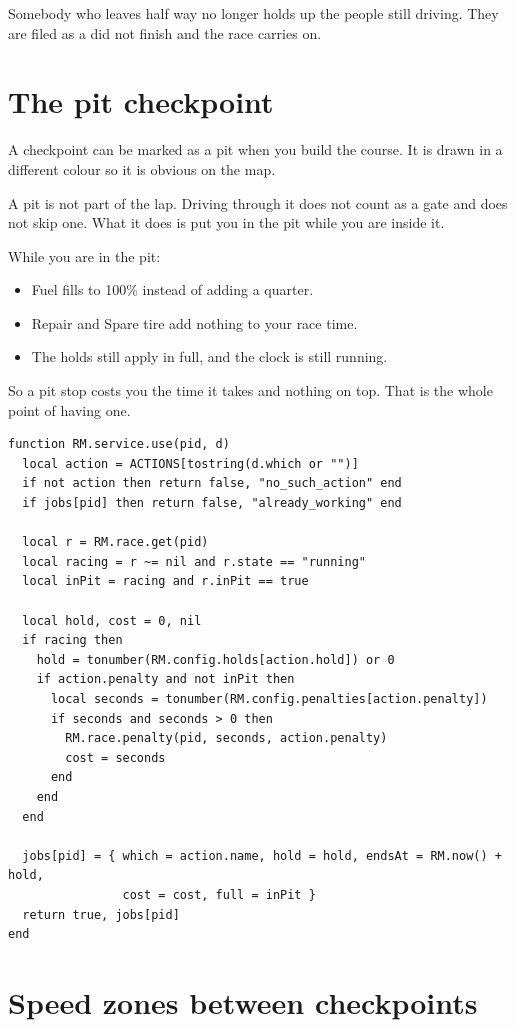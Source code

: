 \documentclass[11pt,a4paper]{article}
\begin{document}
Somebody who leaves half way no longer holds up the people still driving. They
are filed as a did not finish and the race carries on.

\section{The pit checkpoint}

A checkpoint can be marked as a pit when you build the course. It is drawn in a
different colour so it is obvious on the map.

A pit is not part of the lap. Driving through it does not count as a gate and
does not skip one. What it does is put you in the pit while you are inside it.

While you are in the pit:

\begin{itemize}
  \item Fuel fills to 100\% instead of adding a quarter.
  \item Repair and Spare tire add nothing to your race time.
  \item The holds still apply in full, and the clock is still running.
\end{itemize}

So a pit stop costs you the time it takes and nothing on top. That is the whole
point of having one.

\begin{lstlisting}
function RM.service.use(pid, d)
  local action = ACTIONS[tostring(d.which or "")]
  if not action then return false, "no_such_action" end
  if jobs[pid] then return false, "already_working" end

  local r = RM.race.get(pid)
  local racing = r ~= nil and r.state == "running"
  local inPit = racing and r.inPit == true

  local hold, cost = 0, nil
  if racing then
    hold = tonumber(RM.config.holds[action.hold]) or 0
    if action.penalty and not inPit then
      local seconds = tonumber(RM.config.penalties[action.penalty])
      if seconds and seconds > 0 then
        RM.race.penalty(pid, seconds, action.penalty)
        cost = seconds
      end
    end
  end

  jobs[pid] = { which = action.name, hold = hold, endsAt = RM.now() + hold,
                cost = cost, full = inPit }
  return true, jobs[pid]
end
\end{lstlisting}

\section{Speed zones between checkpoints}
\end{document}
